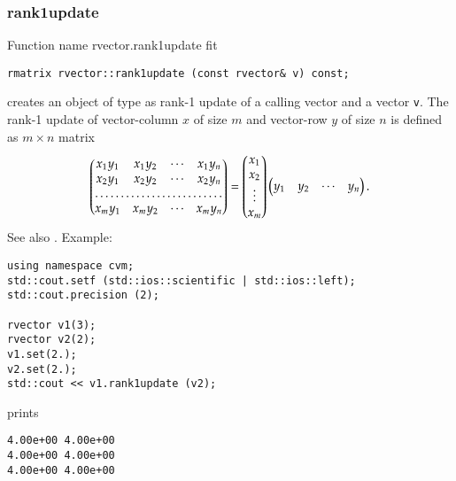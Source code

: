 \subsubsection{rank1update}
Function%
\pdfdest name {rvector.rank1update} fit
\begin{verbatim}
rmatrix rvector::rank1update (const rvector& v) const;
\end{verbatim}
creates an object of type 
as  rank-1 update of
a calling vector and a vector \verb"v".
The rank-1 update of vector-column $x$ of size $m$ and
vector-row $y$ of size $n$ is defined as $m\times n$ matrix
\begin{equation*}
\begin{pmatrix}
x_1 y_1 & x_1 y_2 & \cdots & x_1 y_n \\
x_2 y_1 & x_2 y_2 & \cdots & x_2 y_n \\
\hdotsfor{4} \\
x_m y_1 & x_m y_2 & \cdots & x_m y_n
\end{pmatrix} =
\begin{pmatrix}
x_1 \\
x_2 \\
\vdots \\
x_m
\end{pmatrix}
\begin{pmatrix}
y_1 & y_2 & \cdots & y_n
\end{pmatrix}.
\end{equation*}
See also .
Example:
\begin{Verbatim}
using namespace cvm;
std::cout.setf (std::ios::scientific | std::ios::left); 
std::cout.precision (2);

rvector v1(3);
rvector v2(2);
v1.set(2.);
v2.set(2.);
std::cout << v1.rank1update (v2);
\end{Verbatim}
prints
\begin{Verbatim}
4.00e+00 4.00e+00
4.00e+00 4.00e+00
4.00e+00 4.00e+00
\end{Verbatim}
\newpage





